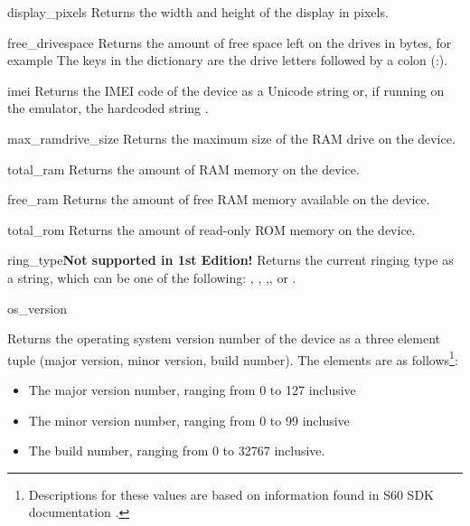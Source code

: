 \begin{funcdesc}{display_pixels}{}
Returns the width and height of the display in pixels.
\end{funcdesc}

\begin{funcdesc}{free_drivespace}{}
Returns the amount of free space left on the drives in bytes, for example 
 The keys in the dictionary are the drive letters 
followed by a colon (:). 
\end{funcdesc}

\begin{funcdesc}{imei}{}
Returns the IMEI code of the device as a Unicode string or, if running
on the emulator, the hardcoded string .
\end{funcdesc}

\begin{funcdesc}{max_ramdrive_size}{}
Returns the maximum size of the RAM drive on the device.
\end{funcdesc}

\begin{funcdesc}{total_ram}{}
Returns the amount of RAM memory on the device.
\end{funcdesc}

\begin{funcdesc}{free_ram}{}
Returns the amount of free RAM memory available on the device.
\end{funcdesc}

\begin{funcdesc}{total_rom}{}
Returns the amount of read-only ROM memory on the device.
\end{funcdesc}

\begin{funcdesc}{ring_type}{}\textbf{Not supported in 1st Edition!}
Returns the current ringing type as a string, which can be one of the 
following: , , 
,, or .
\end{funcdesc}

\begin{funcdesc}{os_version}{}

Returns the operating system version number of the device as a three element tuple (major version, minor version, build number). The 
elements are as follows\footnote{ 
Descriptions for these values are based on information found in S60 SDK 
documentation \cite{S60Doc}.}:

\begin{itemize}
\item The major version number, ranging from 0 to 127 inclusive
\item The minor version number, ranging from 0 to 99 inclusive
\item The build number, ranging from 0 to 32767 inclusive.
\end{itemize}
\end{funcdesc}

